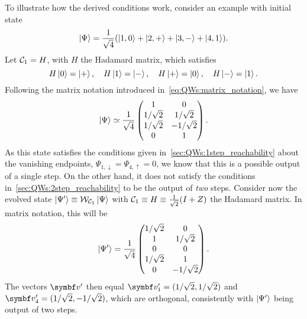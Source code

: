 \begin{example}[label=ex:QWs:conditions_few_steps]
    To illustrate how the derived conditions work, consider an example with initial state
    \begin{equation}
        \ket{\Psi} = \frac{1}{\sqrt4} (
        \ket{1,0} + \ket{2,+} + \ket{3, -} + \ket{4, 1}
        ).
    \end{equation}
    Let ${\mathcal{C}}_1=H$, with $H$ the Hadamard matrix, which satisfies
    \begin{equation}
        H\ket0=\ket+, \quad H\ket1=\ket-,
        \quad H\ket+=\ket0, \quad H\ket-=\ket1.
    \end{equation}
    Following the matrix notation introduced in~\cref{eq:QWs:matrix_notation}, we have
    \begin{equation}
        \ket{\Psi} \simeq
        \frac{1}{\sqrt4}
        \begin{pmatrix}
            1 & 0 \\
            1/\sqrt2 & 1/\sqrt2 \\
            1/\sqrt2 & -1/\sqrt2 \\
            0 & 1
        \end{pmatrix}.
    \end{equation}
    As this state satisfies the conditions given in~\cref{sec:QWs:1step_reachability} about the vanishing endpoints, $\Psi_{1,\downarrow}=\Psi_{4,\uparrow}=0$, we know that this is a possible output of a single step. On the other hand, it does not satisfy the conditions in~\cref{sec:QWs:2step_reachability} to be the output of \textit{two} steps.
    Consider now the evolved state $\ket{\Psi'}\equiv{\mathcal{W}}_{{\mathcal{C}}_1}\ket\Psi$ with ${\mathcal{C}}_1\equiv H\equiv\frac{1}{\sqrt2}(I+Z)$ the Hadamard matrix. In matrix notation, this will be
    \begin{equation}
        \ket{\Psi'} =
        \frac{1}{\sqrt4}
        \begin{pmatrix}
            1/\sqrt2 & 0 \\
            1 & 1/\sqrt2 \\ 
            0 & 0 \\
            1/\sqrt2 & 1 \\
            0 & -1/\sqrt2
        \end{pmatrix}.
        \label{eq:QWs:example_psi'}
    \end{equation}
    The vectors $\bs v'$ then equal $\bs v'_1=(1/\sqrt2, 1/\sqrt2)$ and
    $\bs v'_4=(1/\sqrt2, -1/\sqrt2)$,
    which are orthogonal, consistently with $\ket{\Psi'}$ being output of two steps.

\end{example}
